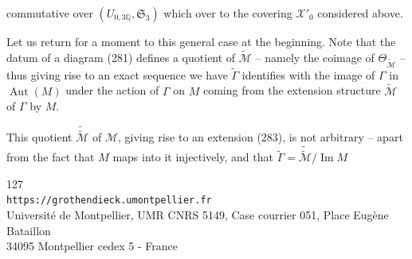 
commutative over $(U_{0,3\mathbb Q},\mathfrak S_3)$ which over   to the covering $\mathcal X'_0$ considered above.

Let us return for a moment to this general case at the beginning. Note that the datum of a diagram (281)  defines a quotient  of $\widetilde{\mathcal M}$ -- namely the coimage of $\Theta_{\widetilde{\mathcal M}}$ --   thus giving rise to an  exact sequence
 we have
$\widetilde\Gamma$ identifies with the image of $\Gamma$ in $\operatorname{Aut}(M)$ under the action of $\Gamma$ on $M$ coming from the extension structure $\widetilde{\mathcal M}$ of $\Gamma$ by $M$.

 This quotient $\widetilde{\widetilde{\mathcal M}}$ of $\mathcal M$, giving rise to an extension (283), is not arbitrary -- apart from the fact that $M$ maps into it injectively, and that $\widetilde\Gamma=\widetilde{\widetilde{\mathcal M}}/\operatorname{Im}M$


\begin{center}
\small
127\\
\texttt{https://grothendieck.umontpellier.fr}\\
Université de Montpellier, UMR CNRS 5149, Case courrier 051, Place Eugène Bataillon\\
34095 Montpellier cedex 5 - France
\end{center}


